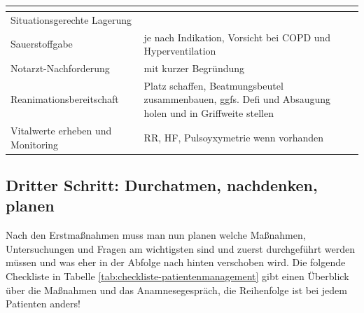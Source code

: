 \begin{center}
\begin{tabulary}{\linewidth}{LL}
\toprule
{}
\\\midrule
Situationsgerechte Lagerung
 &
\\\midrule
Sauerstoffgabe
 &
je nach Indikation, Vorsicht bei COPD und Hyper\-ventilation
\\\midrule
Notarzt{}-Nachforderung
 &
mit kurzer Begr\"undung
\\\midrule
Reanimationsbereitschaft
 &
Platz schaffen, Beatmungsbeutel zu\-sammen\-bauen, ggfs. Defi und
Absaugung holen und in Griffweite stellen
\\\midrule
Vitalwerte erheben und Monitoring
 &
RR, HF, Pulsoyxymetrie wenn vor\-handen
\\\bottomrule
\end{tabulary}
\end{center}

\subsection{Dritter Schritt: Durchatmen, nachdenken, planen}

Nach den Erstma{\ss}nahmen muss man nun planen welche Ma{\ss}nahmen,
Untersuchungen und Fragen am wichtigsten sind und zuerst durchgef\"uhrt
werden m\"ussen und was eher in der Abfolge nach hinten ver\-schoben
wird. Die folgende Checkliste in Tabelle
\ref{tab:checkliste-patientenmanagement} gibt einen
\"Uberblick \"uber die Ma{\ss}nahmen und das Anamnese\-ge\-spr\"ach, die Reihenfolge ist bei jedem Patienten anders!


